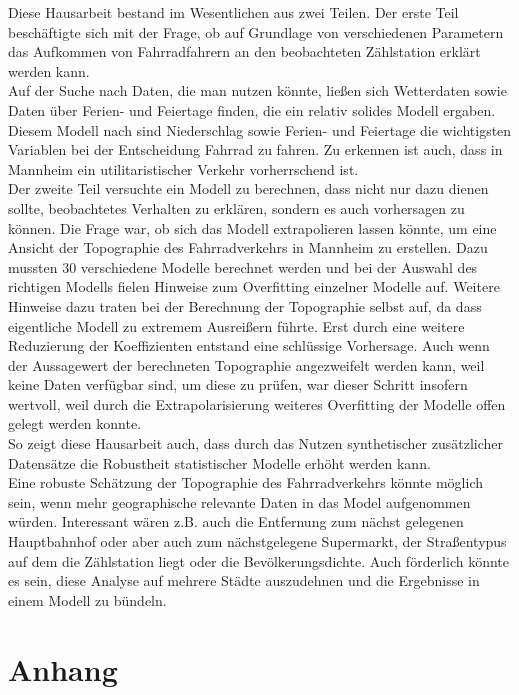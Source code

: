 \documentclass[a4paper,12pt]{thesis}
\begin{document}
Diese Hausarbeit bestand im Wesentlichen aus zwei Teilen. Der erste Teil beschäftigte sich mit der Frage, ob auf Grundlage von verschiedenen Parametern das Aufkommen von Fahrradfahrern an den beobachteten Zählstation erklärt werden kann.\\
Auf der Suche nach Daten, die man nutzen könnte, ließen sich Wetterdaten sowie Daten über Ferien- und Feiertage finden, die ein relativ solides Modell ergaben. Diesem Modell nach sind Niederschlag sowie Ferien- und Feiertage die wichtigsten Variablen bei der Entscheidung Fahrrad zu fahren. Zu erkennen ist auch, dass in Mannheim ein utilitaristischer Verkehr vorherrschend ist.\\
Der zweite Teil versuchte ein Modell zu berechnen, dass nicht nur dazu dienen sollte, beobachtetes Verhalten zu erklären, sondern es auch vorhersagen zu können. Die Frage war, ob sich das Modell extrapolieren lassen könnte, um eine Ansicht der Topographie des Fahrradverkehrs in Mannheim zu erstellen. Dazu mussten 30 verschiedene Modelle berechnet werden und bei der Auswahl des richtigen Modells fielen Hinweise zum Overfitting einzelner Modelle auf. Weitere Hinweise dazu traten bei der Berechnung der Topographie selbst auf, da dass eigentliche Modell zu extremem Ausreißern führte. Erst durch eine weitere Reduzierung der Koeffizienten entstand eine schlüssige Vorhersage. Auch wenn der Aussagewert der berechneten Topographie angezweifelt werden kann, weil keine Daten verfügbar sind, um diese zu prüfen, war dieser Schritt insofern wertvoll, weil durch die Extrapolarisierung weiteres Overfitting der Modelle offen gelegt werden konnte.\\
So zeigt diese Hausarbeit auch, dass durch das Nutzen synthetischer zusätzlicher Datensätze die Robustheit statistischer Modelle erhöht werden kann.\\
Eine robuste Schätzung der Topographie des Fahrradverkehrs könnte möglich sein, wenn mehr geographische relevante Daten in das Model aufgenommen würden. Interessant wären z.B. auch die Entfernung zum nächst gelegenen Hauptbahnhof oder aber auch zum nächstgelegene Supermarkt, der Straßentypus auf dem die Zählstation liegt oder die Bevölkerungsdichte. Auch förderlich könnte es sein, diese Analyse auf mehrere Städte auszudehnen und die Ergebnisse in einem Modell zu bündeln.





\chapter{Anhang}
\end{document}
